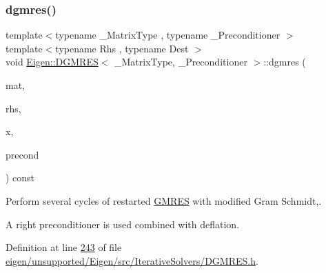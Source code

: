 \subsubsection{\texorpdfstring{dgmres()}{dgmres()}}
{\footnotesize\ttfamily template$<$typename \+\_\+\+Matrix\+Type , typename \+\_\+\+Preconditioner $>$ \\
template$<$typename Rhs , typename Dest $>$ \\
void \hyperlink{class_eigen_1_1_d_g_m_r_e_s}{Eigen\+::\+D\+G\+M\+R\+ES}$<$ \+\_\+\+Matrix\+Type, \+\_\+\+Preconditioner $>$\+::dgmres (\begin{DoxyParamCaption}\item[{const Matrix\+Type \&}]{mat,  }\item[{const Rhs \&}]{rhs,  }\item[{Dest \&}]{x,  }\item[{const Preconditioner \&}]{precond }\end{DoxyParamCaption}) const\hspace{0.3cm}{\ttfamily [protected]}}



Perform several cycles of restarted \hyperlink{group___iterative_linear_solvers___module_class_eigen_1_1_g_m_r_e_s}{G\+M\+R\+ES} with modified Gram Schmidt,. 

A right preconditioner is used combined with deflation. 

Definition at line \hyperlink{eigen_2unsupported_2_eigen_2src_2_iterative_solvers_2_d_g_m_r_e_s_8h_source_l00243}{243} of file \hyperlink{eigen_2unsupported_2_eigen_2src_2_iterative_solvers_2_d_g_m_r_e_s_8h_source}{eigen/unsupported/\+Eigen/src/\+Iterative\+Solvers/\+D\+G\+M\+R\+E\+S.\+h}.

\mbox{\label{class_eigen_1_1_d_g_m_r_e_s_a151b188720b20e13e8e6b112a8bcc167}} 

